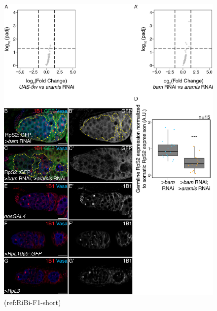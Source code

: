\documentclass[12pt,oneside]{reedthesis}
\begin{document}
\begin{figure}

{\centering \includegraphics[width=6.5 in,height=8.9375 in]{./figure/Ribosome Biogenesis/Ribosome Biogenesis 4S} 

}

\caption[(ref:RiBi-F1-short)]{(ref:RiBi-F1-short)}\label{fig:unnamed-chunk-13}
\end{figure}
\end{document}
